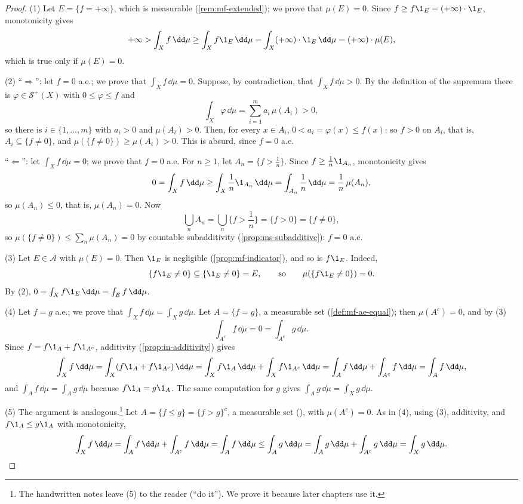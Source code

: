 \begin{proof}
(1) Let $E=\{f=+\infty\}$, which is measurable (\cref{rem:mf-extended}); we prove that
$\mu(E)=0$. Since $f\ge f\1_E=(+\infty)\cdot\1_E$, monotonicity gives
\[
  +\infty>\int_Xf\,\dd\mu\ge\int_Xf\1_E\,\dd\mu=\int_X(+\infty)\cdot\1_E\,\dd\mu=(+\infty)\cdot\mu(E),
\]
which is true only if $\mu(E)=0$.

(2) ``$\Rightarrow$'': let $f=0$ a.e.; we prove that $\int_Xf\,\dd\mu=0$. Suppose, by
contradiction, that $\int_Xf\,\dd\mu>0$. By the definition of the supremum there is
$\varphi\in\mathcal S^+(X)$ with $0\le\varphi\le f$ and
\[
  \int_X\varphi\,\dd\mu=\sum_{i=1}^ma_i\,\mu(A_i)>0 ,
\]
so there is $i\in\{1,\dots,m\}$ with $a_i>0$ and $\mu(A_i)>0$. Then, for every $x\in A_i$,
$0<a_i=\varphi(x)\le f(x)$: so $f>0$ on $A_i$, that is, $A_i\subseteq\{f\ne0\}$, and
$\mu(\{f\ne0\})\ge\mu(A_i)>0$. This is absurd, since $f=0$ a.e.

``$\Leftarrow$'': let $\int_Xf\,\dd\mu=0$; we prove that $f=0$ a.e. For $n\ge1$, let
$A_n=\{f>\frac1n\}$. Since $f\ge\frac1n\1_{A_n}$, monotonicity gives
\[
  0=\int_Xf\,\dd\mu\ge\int_X\frac1n\1_{A_n}\,\dd\mu=\int_{A_n}\frac1n\,\dd\mu=\frac1n\,\mu(A_n),
\]
so $\mu(A_n)\le0$, that is, $\mu(A_n)=0$. Now
\[
  \bigcup_nA_n=\bigcup_n\Big\{f>\frac1n\Big\}=\{f>0\}=\{f\ne0\},
\]
so $\mu(\{f\ne0\})\le\sum_n\mu(A_n)=0$ by countable subadditivity
(\cref{prop:ms-subadditive}): $f=0$ a.e.

(3) Let $E\in\mathcal A$ with $\mu(E)=0$. Then $\1_E$ is negligible (\cref{prop:mf-indicator}), and so
is $f\1_E$. Indeed,
\[
  \{f\1_E\ne0\}\subseteq\{\1_E\ne0\}=E,\qquad\text{so}\qquad\mu(\{f\1_E\ne0\})=0 .
\]
By (2), $0=\int_Xf\1_E\,\dd\mu=\int_Ef\,\dd\mu$.

(4) Let $f=g$ a.e.; we prove that $\int_Xf\,\dd\mu=\int_Xg\,\dd\mu$. Let $A=\{f=g\}$, a measurable
set (\cref{def:mf-ae-equal}); then $\mu(A^c)=0$, and by (3)
\[
  \int_{A^c}f\,\dd\mu=0=\int_{A^c}g\,\dd\mu .
\]
Since $f=f\1_A+f\1_{A^c}$, additivity (\cref{prop:in-additivity}) gives
\[
  \int_Xf\,\dd\mu=\int_X(f\1_A+f\1_{A^c})\,\dd\mu=\int_Xf\1_A\,\dd\mu+\int_Xf\1_{A^c}\,\dd\mu
  =\int_Af\,\dd\mu+\int_{A^c}f\,\dd\mu=\int_Af\,\dd\mu ,
\]
and $\int_Af\,\dd\mu=\int_Ag\,\dd\mu$ because $f\1_A=g\1_A$. The same computation for $g$ gives
$\int_Ag\,\dd\mu=\int_Xg\,\dd\mu$.

(5) The argument is analogous.\footnote{The handwritten notes leave (5) to the reader (``do
it''). We prove it because later chapters use it.} Let $A=\{f\le g\}=\{f>g\}^c$, a measurable set
(), with $\mu(A^c)=0$. As in (4), using (3), additivity, and
$f\1_A\le g\1_A$ with monotonicity,
\[
  \int_Xf\,\dd\mu=\int_Af\,\dd\mu+\int_{A^c}f\,\dd\mu=\int_Af\,\dd\mu\le\int_Ag\,\dd\mu
  =\int_Ag\,\dd\mu+\int_{A^c}g\,\dd\mu=\int_Xg\,\dd\mu .\qedhere
\]
\end{proof}

